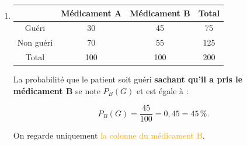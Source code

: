 \documentclass{article}
\theoremstyle{definition}
\begin{document}
\begin{enumerate}
\begin{enumerate}
    La probabilité que le patient ait pris le médicament A \textbf{sachant qu'il est guéri}
    se note $P_G(A)$ et est égale à :

    $$
    P_G(A) = \frac{30}{75} = 0{,}4 = 40\,\%.
    $$

    On regarde uniquement \textcolor{cyan}{la ligne des patients guéris}.

    \item
    \begin{center}
    \begin{tabular}{|c|c|c|c|}
    \hline
    & Médicament A & \cellcolor{orange!80}Médicament B & Total \\
    \hline
    Guéri & 30 & \cellcolor{orange!80}45 & 75 \\
    \hline
    Non guéri & 70 & \cellcolor{orange!80}55 & 125 \\
    \hline
    Total & 100 & \cellcolor{orange!80}100 & 200 \\
    \hline
    \end{tabular}
    \end{center}

    La probabilité que le patient soit guéri \textbf{sachant qu'il a pris le médicament B}
    se note $P_B(G)$ et est égale à :

    $$
    P_B(G) = \frac{45}{100} = 0{,}45 = 45\,\%.
    $$

    On regarde uniquement \textcolor{orange}{la colonne du médicament B}.
\end{enumerate}

\end{enumerate}

\vfill
\end{document}
